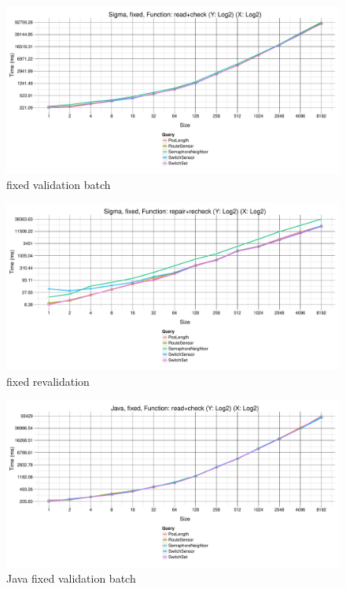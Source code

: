 \begin{figure}[h!tb]
  \centering
  \includegraphics[width=\textwidth]{figures/fixed-Sigma-GroupBy-Query-time-batch-validation.pdf}
  \caption{\SIGMA fixed validation batch}
  \label{fig:SigmaFixedValidationBatch}
\end{figure}

\begin{figure}[h!tb]
  \centering
  \includegraphics[width=\textwidth]{figures/fixed-Sigma-GroupBy-Query-time-revalidation.pdf}
  \caption{\SIGMA fixed revalidation}
  \label{fig:SigmaFixedReValidationBatch}
\end{figure}

\begin{figure}[h!tb]
  \centering
  \includegraphics[width=\textwidth]{figures/fixed-Java-GroupBy-Query-time-batch-validation.pdf}
  \caption{Java fixed validation batch}
  \label{fig:JavaFixedValidationBatch}
\end{figure}

